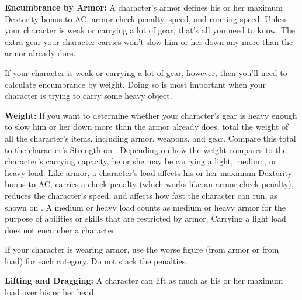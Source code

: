 \textbf{Encumbrance by Armor:} A character's armor defines his or her maximum Dexterity bonus to AC, armor check penalty, speed, and running speed. Unless your character is weak or carrying a lot of gear, that's all you need to know. The extra gear your character carries won't slow him or her down any more than the armor already does.

If your character is weak or carrying a lot of gear, however, then you'll need to calculate encumbrance by weight. Doing so is most important when your character is trying to carry some heavy object.

\textbf{Weight:} If you want to determine whether your character's gear is heavy enough to slow him or her down more than the armor already does, total the weight of all the character's items, including armor, weapons, and gear. Compare this total to the character's Strength on . Depending on how the weight compares to the character's carrying capacity, he or she may be carrying a light, medium, or heavy load. Like armor, a character's load affects his or her maximum Dexterity bonus to AC, carries a check penalty (which works like an armor check penalty), reduces the character's speed, and affects how fast the character can run, as shown on . A medium or heavy load counts as medium or heavy armor for the purpose of abilities or skills that are restricted by armor. Carrying a light load does not encumber a character.

If your character is wearing armor, use the worse figure (from armor or from load) for each category. Do not stack the penalties.


\textbf{Lifting and Dragging:} A character can lift as much as his or her maximum load over his or her head.

